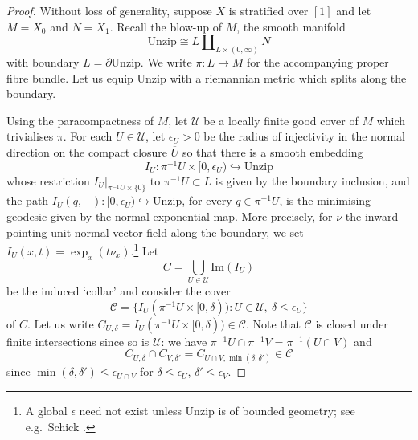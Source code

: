 \documentclass[11pt]{amsart}
\newcommand{\mcal}[1]{\mathcal{#1}}
\newcommand{\mrm}[1]{\mathrm{#1}}
\numberwithin{equation}{section}
\theoremstyle{definition}
\theoremstyle{remark}
\theoremstyle{plain}
\begin{document}
\begin{proof}
    Without loss of generality, suppose $X$ is stratified over $[1]$ and let $M=X_0$ and $N=X_1$. Recall the blow-up of $M$, the smooth manifold
    \[
        \mrm{Unzip}\cong L\amalg_{L\times(0,\infty)}N
    \]
    with boundary $L=\partial\mrm{Unzip}$. We write $\pi\colon L\to M$ for the accompanying proper fibre bundle. Let us equip $\mrm{Unzip}$ with a riemannian metric which splits along the boundary.

    Using the paracompactness of $M$, let $\mcal{U}$ be a locally finite good cover of $M$ which trivialises $\pi$. For each $U\in\mcal{U}$, let $\epsilon_U>0$ be the radius of injectivity in the normal direction on the compact closure $\overline{U}$ so that there is a smooth embedding 
    \[
        I_U\colon \pi^{-1}U\times[0,\epsilon_U)\hookrightarrow \mrm{Unzip}
    \]
    whose restriction $I_U|_{\pi^{-1}U\times\{0\}}$ to $\pi^{-1}U\subset L$ is given by the boundary inclusion, and the path $I_U(q,-)\colon[0,\epsilon_U)\hookrightarrow \mrm{Unzip}$, for every $q\in\pi^{-1}U$, is the minimising geodesic given by the normal exponential map. More precisely, for $\nu$ the inward-pointing unit normal vector field along the boundary, we set $I_U(x,t)=\exp_x(t\nu_x)$.\footnote{A global $\epsilon$ need not exist unless $\mrm{Unzip}$ is of bounded geometry; see e.g.\ Schick \cite{schick2001bounded}.} Let 
    \[
        C=\bigcup_{U\in\mcal{U}}\mrm{Im}(I_U)
    \]
    be the induced `collar' and consider the cover
    \[  
        \mcal{C}=\{I_U(\pi^{-1}U\times[0,\delta)) : U\in\mcal{U},\ \delta\leq\epsilon_U\}
    \]
    of $C$. Let us write $C_{U,\delta}=I_U(\pi^{-1}U\times[0,\delta))\in\mcal{C}$. Note that $\mcal{C}$ is closed under finite intersections since so is $\mcal{U}$: we have $\pi^{-1}U\cap\pi^{-1}V=\pi^{-1}(U\cap V)$ and
    \[
        C_{U,\delta}\cap C_{V,\delta'}=C_{U\cap V,\min(\delta,\delta')}\in\mcal{C}
    \] 
    since $\min(\delta,\delta')\leq\epsilon_{U\cap V}$ for $\delta\leq\epsilon_U$, $\delta'\leq\epsilon_V$.
    

\end{proof}
\end{document}

